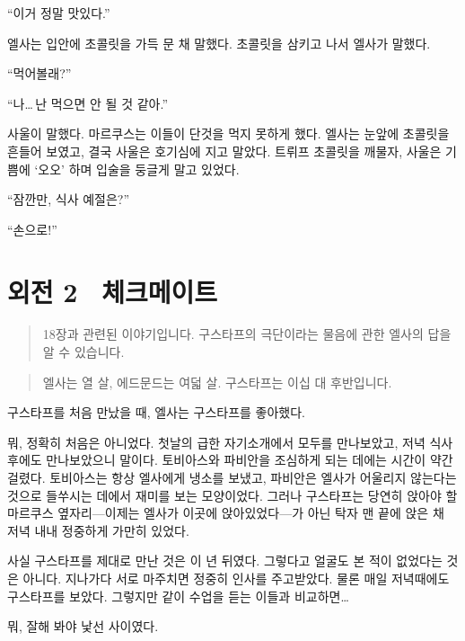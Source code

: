 ``이거 정말 맛있다.''

엘사는 입안에 초콜릿을 가득 문 채 말했다. 초콜릿을 삼키고 나서 엘사가 말했다.

``먹어볼래?''

``나\ldots\,난 먹으면 안 될 것 같아.''

사울이 말했다. 마르쿠스는 이들이 단것을 먹지 못하게 했다. 엘사는 눈앞에 초콜릿을 흔들어 보였고, 결국 사울은 호기심에 지고 말았다. 트뤼프 초콜릿을 깨물자, 사울은 기쁨에 `오오' 하며 입술을 둥글게 말고 있었다.

``잠깐만, 식사 예절은?''

``손으로!''



\chapter[외전2. 체크메이트][외전 2\hspace*{.5em}체크메이트]{외전 2 \ 체크메이트}



\begin{quote}

\small 18장과 관련된 이야기입니다. 구스타프의 극단이라는 물음에 관한 엘사의 답을 알 수 있습니다.

\end{quote}

\begin{quote}

\small 엘사는 열 살, 에드문드는 여덟 살. 구스타프는 이십 대 후반입니다.

\end{quote}구스타프를 처음 만났을 때, 엘사는 구스타프를 좋아했다.

뭐, 정확히 처음은 아니었다. 첫날의 급한 자기소개에서 모두를 만나보았고, 저녁 식사 후에도 만나보았으니 말이다. 토비아스와 파비안을 조심하게 되는 데에는 시간이 약간 걸렸다. 토비아스는 항상 엘사에게 냉소를 보냈고, 파비안은 엘사가 어울리지 않는다는 것으로 들쑤시는 데에서 재미를 보는 모양이었다. 그러나 구스타프는 당연히 앉아야 할 마르쿠스 옆자리—이제는 엘사가 이곳에 앉아있었다—가 아닌 탁자 맨 끝에 앉은 채 저녁 내내 정중하게 가만히 있었다.

사실 구스타프를 제대로 만난 것은 이 년 뒤였다. 그렇다고 얼굴도 본 적이 없었다는 것은 아니다. 지나가다 서로 마주치면 정중히 인사를 주고받았다. 물론 매일 저녁때에도 구스타프를 보았다. 그렇지만 같이 수업을 듣는 이들과 비교하면\ldots

뭐, 잘해 봐야 낯선 사이였다.

